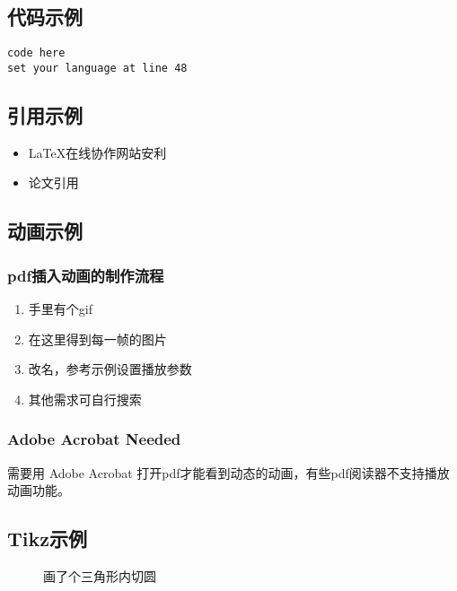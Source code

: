 \documentclass[a4paper]{article}
\begin{document}
\subsection{代码示例}
\begin{lstlisting}
code here
set your language at line 48

\end{lstlisting}

\subsection{引用示例}
\begin{itemize}
 \item  LaTeX在线协作网站安利\cite{overleaf}
 \item  论文引用\cite{six-directional}

\end{itemize}

\subsection{动画示例}
\subsubsection{pdf插入动画的制作流程}

\begin{enumerate}
\item 手里有个gif
\item 在这里\cite{iloveimg}得到每一帧的图片
\item 改名，参考示例设置播放参数
\item 其他需求可自行搜索
\end{enumerate}

\subsubsection{Adobe Acrobat Needed}
需要用 Adobe Acrobat 打开pdf才能看到动态的动画，有些pdf阅读器不支持播放动画功能。
\begin{figure}[H]
\centering
{}

\end{figure}


\subsection{Tikz示例}
\begin{figure}[H]
\centering
{}
\caption{画了个三角形内切圆}
\end{figure}
\end{document}
